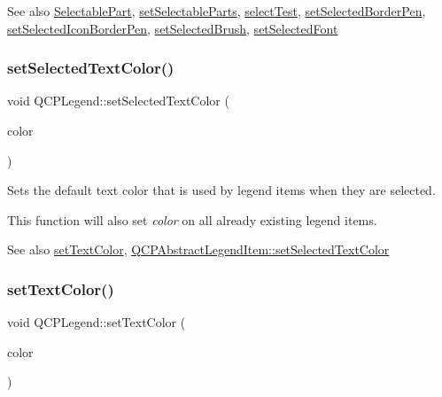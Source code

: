 \begin{DoxySeeAlso}{See also}
\hyperlink{class_q_c_p_legend_a5404de8bc1e4a994ca4ae69e2c7072f1}{Selectable\+Part}, \hyperlink{class_q_c_p_legend_a9ce60aa8bbd89f62ae4fa83ac6c60110}{set\+Selectable\+Parts}, \hyperlink{class_q_c_p_legend_acd7be544c81324e391cfa6be9c413c01}{select\+Test}, \hyperlink{class_q_c_p_legend_a2c35d262953a25d96b6112653fbefc88}{set\+Selected\+Border\+Pen}, \hyperlink{class_q_c_p_legend_ade93aabe9bcccaf9cf46cec22c658027}{set\+Selected\+Icon\+Border\+Pen}, \hyperlink{class_q_c_p_legend_a875227f3219c9799464631dec5e8f1bd}{set\+Selected\+Brush}, \hyperlink{class_q_c_p_legend_ab580a01c3c0a239374ed66c29edf5ad2}{set\+Selected\+Font} 
\end{DoxySeeAlso}
\hypertarget{class_q_c_p_legend_a7674dfc7a1f30e1abd1018c0ed45e0bc}{}\label{class_q_c_p_legend_a7674dfc7a1f30e1abd1018c0ed45e0bc} 
\subsubsection{\texorpdfstring{set\+Selected\+Text\+Color()}{setSelectedTextColor()}}
{\footnotesize\ttfamily void Q\+C\+P\+Legend\+::set\+Selected\+Text\+Color (\begin{DoxyParamCaption}\item[{const Q\+Color \&}]{color }\end{DoxyParamCaption})}

Sets the default text color that is used by legend items when they are selected.

This function will also set {\itshape color} on all already existing legend items.

\begin{DoxySeeAlso}{See also}
\hyperlink{class_q_c_p_legend_ae1eb239ff4a4632fe1b6c3e668d845c6}{set\+Text\+Color}, \hyperlink{class_q_c_p_abstract_legend_item_a4d01d008ee1a5bfe9905b0397a421936}{Q\+C\+P\+Abstract\+Legend\+Item\+::set\+Selected\+Text\+Color} 
\end{DoxySeeAlso}
\hypertarget{class_q_c_p_legend_ae1eb239ff4a4632fe1b6c3e668d845c6}{}\label{class_q_c_p_legend_ae1eb239ff4a4632fe1b6c3e668d845c6} 
\subsubsection{\texorpdfstring{set\+Text\+Color()}{setTextColor()}}
{\footnotesize\ttfamily void Q\+C\+P\+Legend\+::set\+Text\+Color (\begin{DoxyParamCaption}\item[{const Q\+Color \&}]{color }\end{DoxyParamCaption})}

